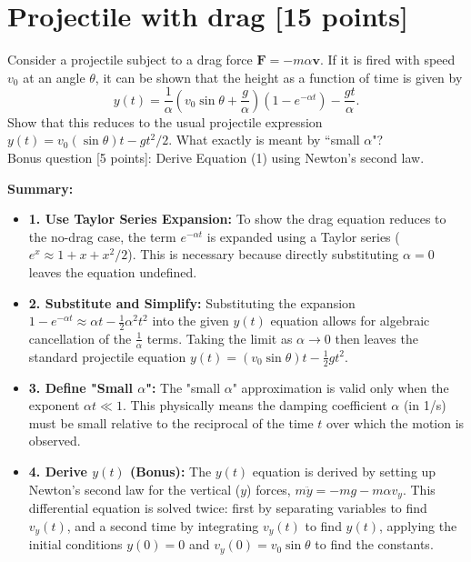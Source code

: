 \documentclass[11pt, a4paper]{article} %
\begin{document}
\newpage
\section*{Projectile with drag [15 points]} 
Consider a projectile subject to a drag force $\textbf{F}=-m\alpha \textbf{v}$. If it is fired
with speed $v_0$ at an angle $\theta$, it can be shown that the height as a function of time is given by 
\begin{equation}
    y(t) = \frac{1}{\alpha} \left( v_0 \sin \theta + \frac{g}{\alpha} \right) \left( 1 - e^{-\alpha t} \right) - \frac{g t}{\alpha}.
\end{equation}
Show that this reduces to the usual projectile expression $y(t)=v_0(\sin\theta) t - gt^2/2$. What exactly is meant by ``small $\alpha$"? \\
Bonus question [5 points]: Derive Equation (1) using Newton's second law. 

\textbf{Summary:}

\begin{itemize}
    \item \textbf{1. Use Taylor Series Expansion:}
    To show the drag equation reduces to the no-drag case, the term $e^{-\alpha t}$ is expanded using a Taylor series ($e^x \approx 1 + x + x^2/2$). This is necessary because directly substituting $\alpha = 0$ leaves the equation undefined.

    \item \textbf{2. Substitute and Simplify:}
    Substituting the expansion $1 - e^{-\alpha t} \approx \alpha t - \frac{1}{2}\alpha^2 t^2$ into the given $y(t)$ equation allows for algebraic cancellation of the $\frac{1}{\alpha}$ terms. Taking the limit as $\alpha \to 0$ then leaves the standard projectile equation $y(t) = (v_0 \sin \theta) t - \frac{1}{2}gt^2$.

    \item \textbf{3. Define "Small $\alpha$":}
    The "small $\alpha$" approximation is valid only when the exponent $\alpha t \ll 1$. This physically means the damping coefficient $\alpha$ (in 1/s) must be small relative to the reciprocal of the time $t$ over which the motion is observed.

    \item \textbf{4. Derive $y(t)$ (Bonus):}
    The $y(t)$ equation is derived by setting up Newton's second law for the vertical ($y$) forces, $m\ddot{y} = -mg - m\alpha v_y$. This differential equation is solved twice: first by separating variables to find $v_y(t)$, and a second time by integrating $v_y(t)$ to find $y(t)$, applying the initial conditions $y(0) = 0$ and $v_y(0) = v_0 \sin \theta$ to find the constants.
\end{itemize}
\end{document}
